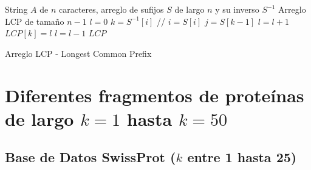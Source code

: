 \newpage

\begin{algorithm}
\begin{algorithmic}[1]
\REQUIRE String $A$ de $n$ caracteres, arreglo de sufijos $S$ de largo $n$ y su inverso $S^{-1}$ 
\ENSURE Arreglo LCP de tamaño $n-1$
\STATE $l = 0$
	\STATE $k = S^{-1}[i]$ // $i = S[i]$
	\STATE $j = S[k-1]$
    	\STATE $l = l+1$
	\ENDWHILE
	\STATE $LCP[k] = l$
		\STATE $l = l - 1$
	\ENDIF
\ENDFOR
\RETURN $LCP$
\end{algorithmic}
\caption{Arreglo LCP - Longest Common Prefix} \label{alg:algoritmo4}
\end{algorithm}

\newpage

\section*{Diferentes fragmentos de proteínas de largo $k = 1$ hasta $k = 50$}

\subsection*{Base de Datos SwissProt ($k$ entre 1 hasta 25)}

